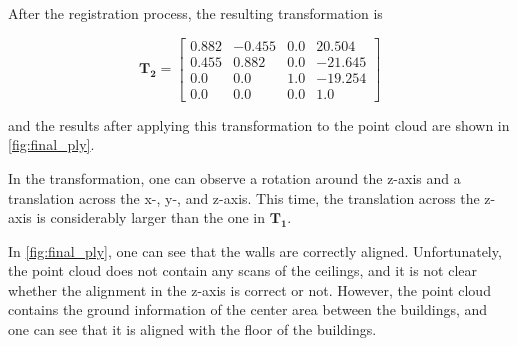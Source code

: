         After the registration process, the resulting transformation is

        \begin{equation*}
            \pmb{T_2} = 
            \begin{bmatrix}
                0.882 & -0.455 & 0.0 & 20.504 \\ 
                0.455 & 0.882 & 0.0 & -21.645 \\
                0.0 & 0.0 & 1.0 & -19.254 \\
                0.0 & 0.0 & 0.0 & 1.0
            \end{bmatrix}    
        \end{equation*}
        
        and the results after applying this transformation to the point cloud are shown in \autoref{fig:final_ply}.        

        In the transformation, one can observe a rotation around the z-axis and a translation across the x-, y-, and z-axis.
        This time, the translation across the z-axis is considerably larger than the one in $\pmb{T_1}$.

        In \autoref{fig:final_ply}, one can see that the walls are correctly aligned.
        Unfortunately, the point cloud does not contain any scans of the ceilings, and it is not clear whether the alignment in the z-axis is correct or not. 
        However, the point cloud contains the ground information of the center area between the buildings, 
        and one can see that it is aligned with the floor of the buildings.
        
